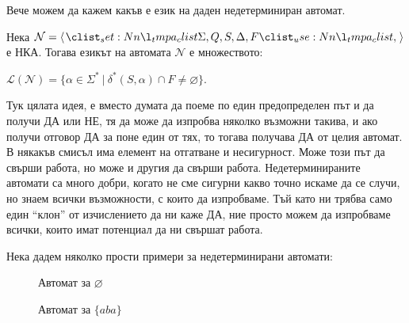 Вече можем да кажем какъв е език на даден недетерминиран автомат.

\begin{definition}
    Нека $\mathcal{N} = \opair{\Sigma, Q, S, \Delta, F}$ е НКА.
    Тогава езикът на автомата $\mathcal{N}$ е множеството:
    \begin{center}
        $\mathcal{L}(\mathcal{N}) = \{ \alpha \in \Sigma^* \: | \: \delta^*(S, \alpha) \cap F \neq \varnothing \}$.
    \end{center}
\end{definition}

Тук цялата идея, е вместо думата да поеме по един предопределен път и да получи ДА или НЕ,
тя да може да изпробва няколко възможни такива, и ако получи отговор ДА за поне един от тях, то тогава получава ДА от целия автомат.
В някакъв смисъл има елемент на отгатване и несигурност. Може този път да свърши работа, но може и другия да свърши работа.
Недетерминираните автомати са много добри, когато не сме сигурни какво точно искаме да се случи, но знаем всички възможности, с които да изпробваме.
Тъй като ни трябва само един ``клон'' от изчислението да ни каже ДА, ние просто можем да изпробваме всички, които имат потенциал да ни свършат работа.

Нека дадем няколко прости примери за недетерминирани автомати:
\begin{figure*}[h]
    \centering
    \begin{subfigure}[b]{0.3\linewidth}
        \centering
        \caption*{Автомат за $\varnothing$}
    \end{subfigure}
    \begin{subfigure}[b]{0.6\linewidth}
        \centering
        \caption*{Автомат за $\{ aba \}$}
    \end{subfigure}
\end{figure*}

